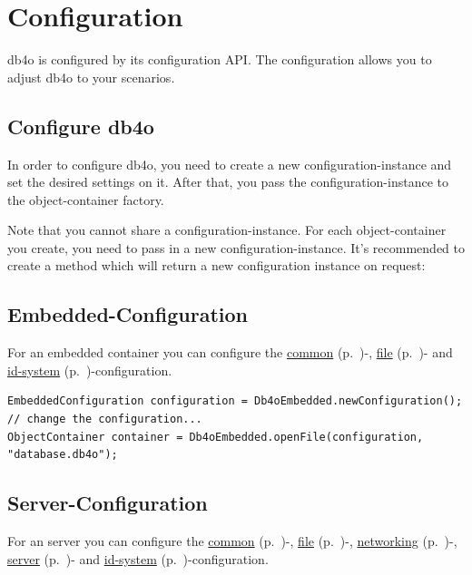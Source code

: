 
\chapter{Configuration}
\label{ref:configuration}

db4o is configured by its configuration API. The configuration allows you to adjust db4o to your scenarios.

\section*{Configure db4o}

In order to configure db4o, you need to create a new configuration-instance and set the desired settings on it. After that, you pass the configuration-instance to the object-container factory.

Note that you cannot share a configuration-instance. For each object-container you create, you need to pass in a new configuration-instance. It's recommended to create a method which will return a new configuration instance on request:

\section*{Embedded-Configuration}

For an embedded container you can configure the \hyperref[ref:configuration-common-configuration]{common} (p.~\pageref{ref:configuration-common-configuration})-, \hyperref[ref:configuration-file-configuration]{file} (p.~\pageref{ref:configuration-file-configuration})- and \hyperref[ref:configuration-id-system]{id-system} (p.~\pageref{ref:configuration-id-system})-configuration.

\begin{lstlisting}
EmbeddedConfiguration configuration = Db4oEmbedded.newConfiguration();
// change the configuration...
ObjectContainer container = Db4oEmbedded.openFile(configuration, "database.db4o");
\end{lstlisting}

\section*{Server-Configuration}

For an server you can configure the \hyperref[ref:configuration-common-configuration]{common} (p.~\pageref{ref:configuration-common-configuration})-, \hyperref[ref:configuration-file-configuration]{file} (p.~\pageref{ref:configuration-file-configuration})-, \hyperref[ref:configuration-network-configuration]{networking} (p.~\pageref{ref:configuration-network-configuration})-, \hyperref[ref:configuration-server-configuration]{server} (p.~\pageref{ref:configuration-server-configuration})- and \hyperref[ref:configuration-id-system]{id-system} (p.~\pageref{ref:configuration-id-system})-configuration.

